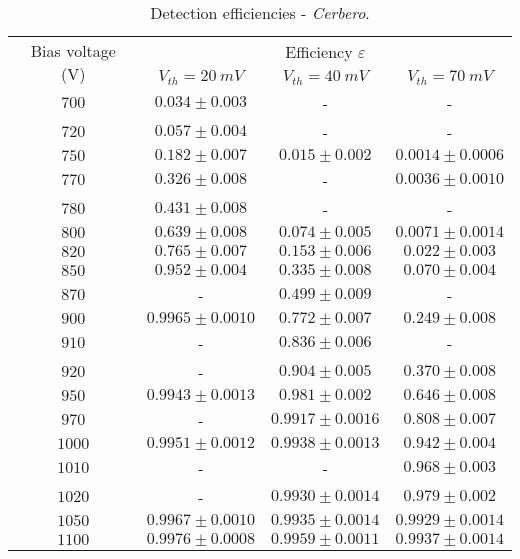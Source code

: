 \begin{table}[!htp]
	\centering
	\begin{tabular}{c|ccc}
		\toprule
		\multirow{2}{*}{Bias voltage (V)}&\multicolumn{3}{c}{Efficiency $\varepsilon$} \\ \cline{2-4}
		&$V_{th}=\SI{20}{mV}$&$V_{th}=\SI{40}{mV}$&$V_{th}=\SI{70}{mV}$\\ \midrule
		$700$ & $0.034 \pm 0.003$ & - & - \\
		$720$ & $0.057 \pm 0.004$ & - & - \\
		$750$ & $0.182 \pm 0.007$ & $0.015 \pm 0.002$ & $0.0014 \pm 0.0006$ \\
		$770$ & $0.326 \pm 0.008$ & - & $0.0036 \pm 0.0010$ \\
		$780$ & $0.431 \pm 0.008$ & - & - \\
		$800$ & $0.639 \pm 0.008$ & $0.074 \pm 0.005$ & $0.0071 \pm 0.0014$ \\
		$820$ & $0.765 \pm 0.007$ & $0.153 \pm 0.006$ & $0.022 \pm 0.003$ \\
		$850$ & $0.952 \pm 0.004$ & $0.335 \pm 0.008$ & $0.070 \pm 0.004$ \\
		$870$ & - & $0.499 \pm 0.009$ & - \\
		$900$ & $0.9965 \pm 0.0010$ & $0.772 \pm 0.007$ & $0.249 \pm 0.008$ \\
		$910$ & - & $0.836 \pm 0.006$ & - \\
		$920$ & - & $0.904 \pm 0.005$ & $0.370 \pm 0.008$ \\
		$950$ & $0.9943 \pm 0.0013$ & $0.981 \pm 0.002$ & $0.646 \pm 0.008$ \\
		$970$ & - & $0.9917 \pm 0.0016$ & $0.808 \pm 0.007$ \\
		$1000$ & $0.9951 \pm 0.0012$ & $0.9938 \pm 0.0013$ & $0.942 \pm 0.004$ \\
		$1010$ & - & - & $0.968 \pm 0.003$ \\
		$1020$ & - & $0.9930 \pm 0.0014$ & $0.979 \pm 0.002$ \\
		$1050$ & $0.9967 \pm 0.0010$ & $0.9935 \pm 0.0014$ & $0.9929 \pm 0.0014$ \\
		$1100$ & $0.9976 \pm 0.0008$ & $0.9959 \pm 0.0011$ & $0.9937 \pm 0.0014$ \\
		\bottomrule
	\end{tabular}
	\caption{Detection efficiencies - \emph{Cerbero}.}
\end{table}

